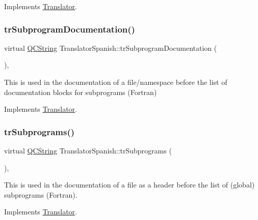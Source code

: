 Implements \mbox{\hyperlink{class_translator}{Translator}}.

\mbox{\label{class_translator_spanish_a82460fd05d6ee7b44b54437d13fed422}} 
\subsubsection{\texorpdfstring{trSubprogramDocumentation()}{trSubprogramDocumentation()}}
{\footnotesize\ttfamily virtual \mbox{\hyperlink{class_q_c_string}{Q\+C\+String}} Translator\+Spanish\+::tr\+Subprogram\+Documentation (\begin{DoxyParamCaption}{ }\end{DoxyParamCaption})\hspace{0.3cm}{\ttfamily [inline]}, {\ttfamily [virtual]}}

This is used in the documentation of a file/namespace before the list of documentation blocks for subprograms (Fortran) 

Implements \mbox{\hyperlink{class_translator}{Translator}}.

\mbox{\label{class_translator_spanish_aba95af0e0c180a3ff6155a06234a692f}} 
\subsubsection{\texorpdfstring{trSubprograms()}{trSubprograms()}}
{\footnotesize\ttfamily virtual \mbox{\hyperlink{class_q_c_string}{Q\+C\+String}} Translator\+Spanish\+::tr\+Subprograms (\begin{DoxyParamCaption}{ }\end{DoxyParamCaption})\hspace{0.3cm}{\ttfamily [inline]}, {\ttfamily [virtual]}}

This is used in the documentation of a file as a header before the list of (global) subprograms (Fortran). 

Implements \mbox{\hyperlink{class_translator}{Translator}}.

\mbox{\label{class_translator_spanish_a498e9c8a57282d42ac819154a04ee9ab}} 
